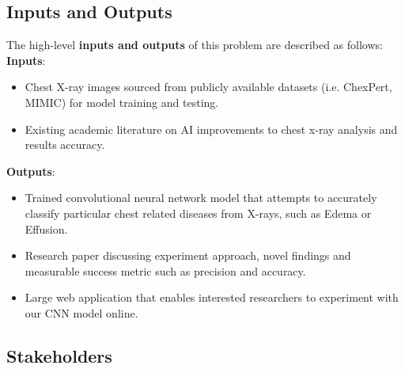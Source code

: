 \documentclass{article}
\begin{document}
\subsection{Inputs and Outputs}

The high-level \textbf{inputs and outputs} of this problem are described as follows:\\
\textbf{Inputs}:
\begin{itemize}
\item Chest X-ray images sourced from publicly available datasets (i.e. ChexPert, MIMIC) for model training and testing.
\item Existing academic literature on AI improvements to chest x-ray analysis and results accuracy.
\end{itemize}

\noindent \textbf{Outputs}:
\begin{itemize}
\item Trained convolutional neural network model that attempts to accurately classify particular chest related diseases from X-rays, such as Edema or Effusion.
\item Research paper discussing experiment approach, novel findings and measurable success metric such as precision and accuracy.
\item Large web application that enables interested researchers to experiment with our CNN model online.

\end{itemize} 

\subsection{Stakeholders}
\end{document}
